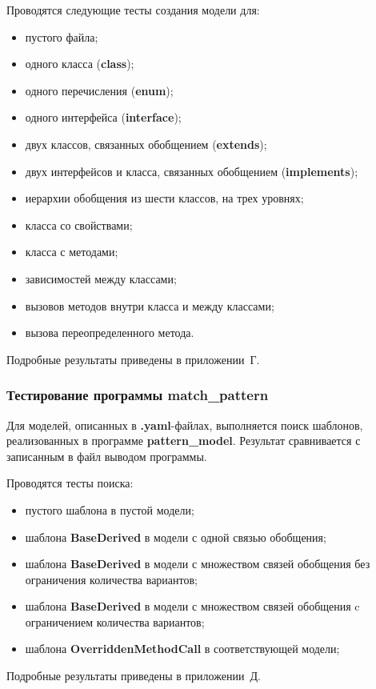Проводятся следующие тесты создания модели для:
\begin{itemize}
\item пустого файла;
\item одного класса (\textbf{class});
\item одного перечисления (\textbf{enum});
\item одного интерфейса (\textbf{interface});
\item двух классов, связанных обобщением (\textbf{extends});
\item двух интерфейсов и класса, связанных обобщением (\textbf{implements});
\item иерархии обобщения из шести классов, на трех уровнях;
\item класса со свойствами;
\item класса с методами;
\item зависимостей между классами;
\item вызовов методов внутри класса и между классами;
\item вызова переопределенного метода.
\end{itemize}

Подробные результаты приведены в приложении~Г.

\subsubsection{Тестирование программы match\_pattern}

Для моделей, описанных в \textbf{.yaml}-файлах, выполняется поиск шаблонов,
реализованных в программе \textbf{pattern\_model}.
Результат сравнивается с записанным в файл выводом программы.

Проводятся тесты поиска:
\begin{itemize}
\item пустого шаблона в пустой модели;
\item шаблона \textbf{BaseDerived} в модели с одной связью обобщения;
\item шаблона \textbf{BaseDerived} в модели с множеством связей обобщения
без ограничения количества вариантов;
\item шаблона \textbf{BaseDerived} в модели с множеством связей обобщения
c ограничением количества вариантов;
\item шаблона \textbf{OverriddenMethodCall} в соответствующей модели;
\end{itemize}

Подробные результаты приведены в приложении~Д.
